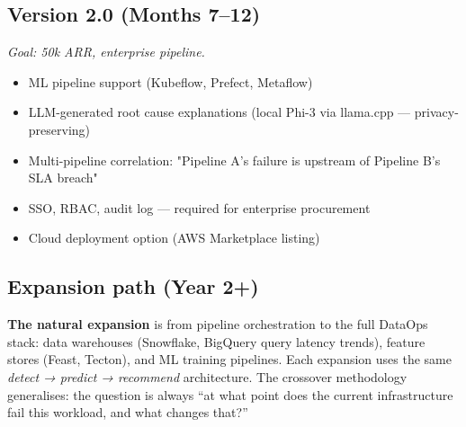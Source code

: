 \subsection{Version 2.0 (Months 7--12)}

\textit{Goal: \texteuro{}50k ARR, enterprise pipeline.}

\begin{itemize}
  \item ML pipeline support (Kubeflow, Prefect, Metaflow)
  \item LLM-generated root cause explanations (local Phi-3 via llama.cpp — privacy-preserving)
  \item Multi-pipeline correlation: "Pipeline A's failure is upstream of Pipeline B's SLA breach"
  \item SSO, RBAC, audit log — required for enterprise procurement
  \item Cloud deployment option (AWS Marketplace listing)
\end{itemize}

\subsection{Expansion path (Year 2+)}

\begin{callout}
\textbf{The natural expansion} is from pipeline orchestration to the full DataOps stack:
data warehouses (Snowflake, BigQuery query latency trends), feature stores (Feast, Tecton),
and ML training pipelines. Each expansion uses the same \emph{detect → predict → recommend}
architecture. The crossover methodology generalises: the question is always
``at what point does the current infrastructure fail this workload, and what changes that?''
\end{callout}
